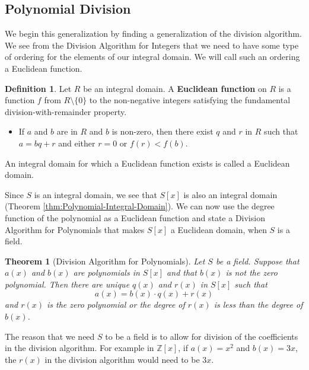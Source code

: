 \documentclass[
]{book}
\providecommand{\tightlist}{%
  \setlength{\itemsep}{0pt}\setlength{\parskip}{0pt}}
\newtheorem{theorem}{Theorem}[chapter]
\theoremstyle{definition}
\newtheorem{definition}{Definition}[chapter]
\theoremstyle{definition}
\theoremstyle{definition}
\theoremstyle{remark}
\begin{document}
\hypertarget{polynomial-division}{%
\subsection{Polynomial Division}\label{polynomial-division}}

We begin this generalization by finding a generalization of the division algorithm. We see from the Division Algorithm for Integers that we need to have some type of ordering for the elements of our integral domain. We will call such an ordering a Euclidean function.

\begin{definition}
\protect\hypertarget{def:unnamed-chunk-194}{}{\label{def:unnamed-chunk-194} }Let \(R\) be an integral domain. A \textbf{Euclidean function} on \(R\) is a function \(f\) from \(R\setminus \{0\}\) to the non-negative integers satisfying the fundamental division-with-remainder property.

\begin{itemize}
\tightlist
\item
  If \(a\) and \(b\) are in \(R\) and \(b\) is non-zero, then there exist \(q\) and \(r\) in \(R\) such that \(a=bq+r\) and either \(r=0\) or \(f(r)<f(b)\).
\end{itemize}

An integral domain for which a Euclidean function exists is called a Euclidean domain.
\end{definition}

Since \(S\) is an integral domain, we see that \(S[x]\) is also an integral domain (Theorem \ref{thm:Polynomial-Integral-Domain}). We can now use the degree function of the polynomial as a Euclidean function and state a Division Algorithm for Polynomials that makes \(S[x]\) a Euclidean domain, when \(S\) is a field.

\begin{theorem}[Division Algorithm for Polynomials]
\protect\hypertarget{thm:Division-Algorithm-Poly}{}{\label{thm:Division-Algorithm-Poly} {} }Let \(S\) be a field. Suppose that \(a(x)\) and \(b(x)\) are polynomials in \(S[x]\) and that \(b(x)\) is not the zero polynomial. Then there are unique \(q(x)\) and \(r(x)\) in \(S[x]\) such that
\[a(x)=b(x)\cdot q(x) + r(x)\] and \(r(x)\) is the zero polynomial or the degree of \(r(x)\) is less than the degree of \(b(x)\).
\end{theorem}

The reason that we need \(S\) to be a field is to allow for division of the coefficients in the division algorithm. For example in \(\mathbb{Z}[x]\), if \(a(x)=x^2\) and \(b(x)=3x\), the \(r(x)\) in the division algorithm would need to be \(3x\).
\end{document}
